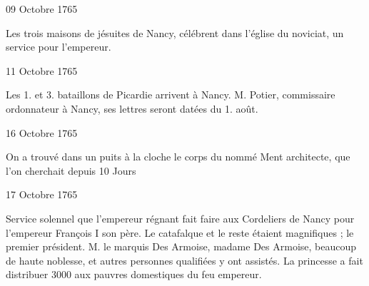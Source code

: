                      \begin{diary}{09 Octobre 1765}{}

                         Les trois maisons de jésuites de
                              Nancy, célébrent
                           dans l’église du
                              noviciat, un
                           service pour l'empereur.
                        \bigskip


                     \end{diary}

                     \begin{diary}{11 Octobre 1765}{}


                           Les 1. et
                                 3.
                              bataillons de Picardie arrivent à Nancy.
                           M. Potier, commissaire ordonnateur à
                              Nancy, ses lettres
                           seront datées du 1.
                              août. \bigskip


                     \end{diary}

                     \begin{diary}{16 Octobre 1765}{}

                         On a trouvé dans un puits à la
                              cloche le corps du
                           nommé Ment architecte, que l'on cherchait depuis 10
                           Jours \bigskip


                     \end{diary}

                     \begin{diary}{17 Octobre 1765}{}

                         Service solennel que l'empereur régnant fait
                           faire aux Cordeliers de
                              Nancy pour l'empereur François I son
                           père. Le catafalque et le
                           reste
                           étaient magnifiques  ; le premier président. M. le marquis
                              Des Armoise, madame
                                 Des Armoise, beaucoup
                           de haute noblesse, et autres personnes qualifiées
                           y ont assistés. La princesse a fait distribuer 3000
                           aux pauvres domestiques du feu empereur. \bigskip


                     \end{diary}


